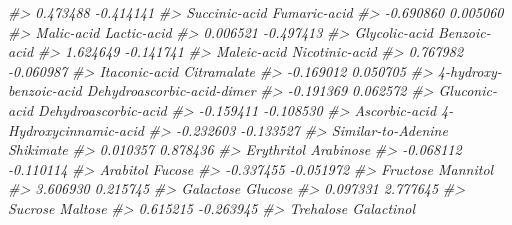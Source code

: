 \documentclass[
]{article}
\newenvironment{Shaded}{\begin{snugshade}}{\end{snugshade}}
\newcommand{\CommentTok}[1]{\textcolor[rgb]{0.56,0.35,0.01}{\textit{#1}}}
\begin{document}
\begin{Shaded}
\begin{Highlighting}[]
\CommentTok{\#\textgreater{}                   0.473488                  {-}0.414141 }
\CommentTok{\#\textgreater{}              Succinic{-}acid               Fumaric{-}acid }
\CommentTok{\#\textgreater{}                  {-}0.690860                   0.005060 }
\CommentTok{\#\textgreater{}                 Malic{-}acid                Lactic{-}acid }
\CommentTok{\#\textgreater{}                   0.006521                  {-}0.497413 }
\CommentTok{\#\textgreater{}              Glycolic{-}acid               Benzoic{-}acid }
\CommentTok{\#\textgreater{}                   1.624649                  {-}0.141741 }
\CommentTok{\#\textgreater{}                Maleic{-}acid             Nicotinic{-}acid }
\CommentTok{\#\textgreater{}                   0.767982                  {-}0.060987 }
\CommentTok{\#\textgreater{}              Itaconic{-}acid                Citramalate }
\CommentTok{\#\textgreater{}                  {-}0.169012                   0.050705 }
\CommentTok{\#\textgreater{}     4{-}hydroxy{-}benzoic{-}acid Dehydroascorbic{-}acid{-}dimer }
\CommentTok{\#\textgreater{}                  {-}0.191369                   0.062572 }
\CommentTok{\#\textgreater{}              Gluconic{-}acid       Dehydroascorbic{-}acid }
\CommentTok{\#\textgreater{}                  {-}0.159411                  {-}0.108530 }
\CommentTok{\#\textgreater{}              Ascorbic{-}acid     4{-}Hydroxycinnamic{-}acid }
\CommentTok{\#\textgreater{}                  {-}0.232603                  {-}0.133527 }
\CommentTok{\#\textgreater{}         Similar{-}to{-}Adenine                  Shikimate }
\CommentTok{\#\textgreater{}                   0.010357                   0.878436 }
\CommentTok{\#\textgreater{}                 Erythritol                  Arabinose }
\CommentTok{\#\textgreater{}                  {-}0.068112                  {-}0.110114 }
\CommentTok{\#\textgreater{}                   Arabitol                     Fucose }
\CommentTok{\#\textgreater{}                  {-}0.337455                  {-}0.051972 }
\CommentTok{\#\textgreater{}                   Fructose                   Mannitol }
\CommentTok{\#\textgreater{}                   3.606930                   0.215745 }
\CommentTok{\#\textgreater{}                  Galactose                    Glucose }
\CommentTok{\#\textgreater{}                   0.097331                   2.777645 }
\CommentTok{\#\textgreater{}                    Sucrose                    Maltose }
\CommentTok{\#\textgreater{}                   0.615215                  {-}0.263945 }
\CommentTok{\#\textgreater{}                  Trehalose                 Galactinol }

\end{Highlighting}
\end{Shaded}
\end{document}
